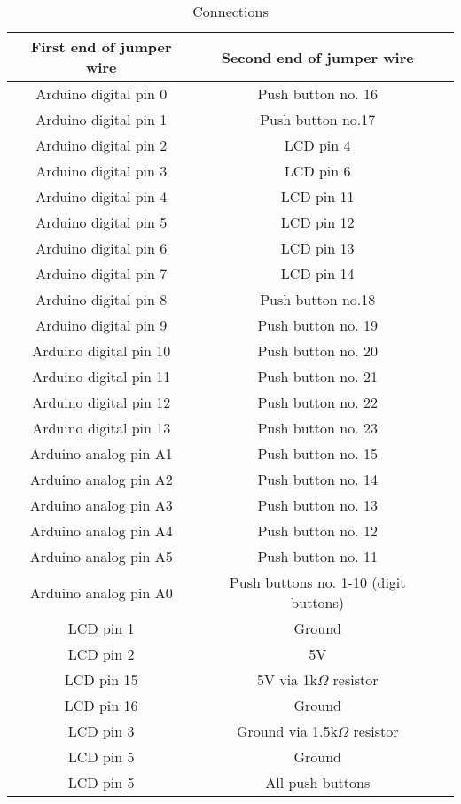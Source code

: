 \begin{table}[H]
\centering
\caption{Connections}
\label{tab:connections}
\begin{tabular}{ccc}
\toprule
First end of jumper wire & Second end of jumper wire \\
\midrule
Arduino digital pin 0 & Push button no. 16 \\
Arduino digital pin 1 & Push button no.17 \\
Arduino digital pin 2 & LCD pin 4 \\
Arduino digital pin 3 & LCD pin 6 \\
Arduino digital pin 4 & LCD pin 11 \\
Arduino digital pin 5 & LCD pin 12 \\
Arduino digital pin 6 & LCD pin 13 \\
Arduino digital pin 7 & LCD pin 14 \\
Arduino digital pin 8 & Push button no.18 \\
Arduino digital pin 9 & Push button no. 19 \\
Arduino digital pin 10 & Push button no. 20 \\
Arduino digital pin 11 & Push button no. 21 \\
Arduino digital pin 12 & Push button no. 22 \\
Arduino digital pin 13 & Push button no. 23 \\
Arduino analog pin A1 & Push button no. 15 \\
Arduino analog pin A2 & Push button no. 14 \\
Arduino analog pin A3 & Push button no. 13 \\
Arduino analog pin A4 & Push button no. 12 \\
Arduino analog pin A5 & Push button no. 11 \\
Arduino analog pin A0 & Push buttons no. 1-10 (digit buttons) \\
LCD pin 1 & Ground \\
LCD pin 2 & 5V \\
LCD pin 15 & 5V via 1k$\Omega$ resistor \\
LCD pin 16 & Ground \\
LCD pin 3 & Ground via 1.5k$\Omega$ resistor \\
LCD pin 5 & Ground \\
LCD pin 5 & All push buttons \\
\bottomrule
\end{tabular}
\end{table}
